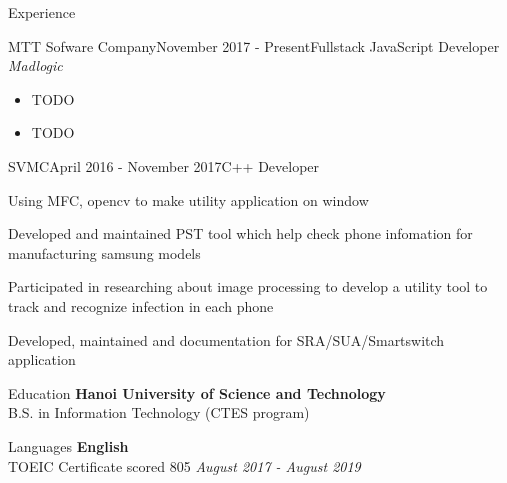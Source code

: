 \documentclass{resume}
\begin{document}
\begin{rSection}{Experience}
\begin{rSubsection}{MTT Sofware Company}{November 2017 - Present}{Fullstack JavaScript Developer}{}
    \emph{Madlogic}
    \begin{itemize}
      \item TODO
      \item TODO
    \end{itemize}
    \end{rSubsection}
  
    \begin{rSubsection}{SVMC}{April 2016 - November 2017}{C++ Developer}{}
    \item Using MFC, opencv to make utility application on window
    \item Developed and maintained PST tool which help check phone infomation for manufacturing samsung models
    \item Participated in researching about image processing to develop a utility tool to track and recognize infection in each phone
    \item Developed, maintained and documentation for SRA/SUA/Smartswitch application
    \end{rSubsection}
  
  \end{rSection}

  \begin{rSection}{Education}
    {\bf Hanoi University of Science and Technology} \\ 
    { B.S. in Information Technology (CTES program) } \\
  \end{rSection}

  \begin{rSection}{Languages}
    {\bf English} \\ 
    { TOEIC Certificate scored 805  } \hfill {\em August 2017 - August 2019} \\
  \end{rSection}
\end{document}
